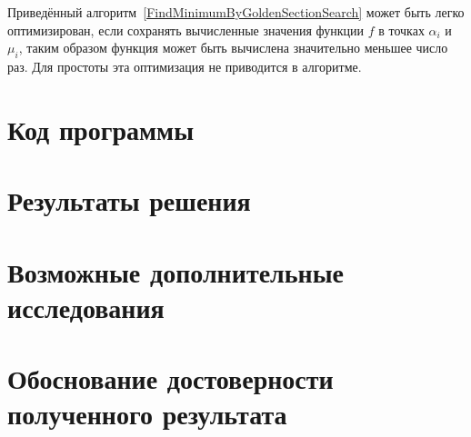 \documentclass[10pt,a4paper,titlepage]{article}
\begin{document}
Приведённый алгоритм~\ref{FindMinimumByGoldenSectionSearch} может быть легко оптимизирован, 
если сохранять вычисленные значения функции $f$ в точках $\alpha_i$ и $\mu_i$, 
таким образом функция может быть вычислена значительно меньшее число раз. 
Для простоты эта оптимизация не приводится в алгоритме.

\section{Код программы}
\lstset{language=Octave, caption=Решение задачи поиска минимума унимодальной функции,%
label=main-source-code, basicstyle=\footnotesize,%
numbers=left, numberstyle=\footnotesize, numbersep=5pt, frame=single, breaklines=true, breakatwhitespace=false,%
inputencoding=utf8x}


\section{Результаты решения}

\section{Возможные дополнительные исследования}
\section{Обоснование достоверности полученного результата}
\end{document}
